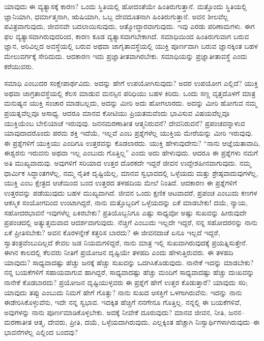 \vskip 5pt

ಯಾವುದು ಈ ವ್ಯತ್ಯಾಸಕ್ಕೆ ಕಾರಣ? ಒಂದು ಸ್ಥಿತಿಯಲ್ಲಿ ಹೋದಂತೆಯೇ ಹಿಂತಿರುಗುತ್ತಾನೆ. ಮತ್ತೊಂದು ಸ್ಥಿತಿಯಲ್ಲಿ ಜ್ಞಾನಿಯಾಗಿ, ಧರ್ಮಾತ್ಮನಾಗಿ, ಋಷಿಯಾಗಿ, ಒಬ್ಬ ದೇವದೂತನಾಗಿ ಹಿಂತಿರುಗುತ್ತಾನೆ. ಅವನ ಶೀಲವೆಲ್ಲ ಪವಿತ್ರವಾಗುವುದು, ಜೀವನವೇ ಬದಲಾಯಿಸುವುದು, ಆತ್ಮೋದ್ಧಾರವಾಗುವುದು. ಇವು ಎರಡು ಪರಿಣಾಮಗಳು. ಈಗ ಫಲ ವ್ಯತ್ಯಾಸವಾಗಿರುವುದರಿಂದ, ಕಾರಣ ಕೂಡ ವ್ಯತ್ಯಾಸವಾಗಬೇಕಾಗಿದೆ. ಸಮಾಧಿಯಿಂದ ಹಿಂತಿರುಗುವಾಗ ಬರುವ ಜ್ಞಾನ, ಅರಿವಿಲ್ಲದ ಅವಸ್ಥೆಯಲ್ಲಿ ಬರುವ ಅಥವಾ ಜಾಗೃತಾವಸ್ಥೆಯಲ್ಲಿ ಯುಕ್ತಿ ಪೂರ್ಣವಾಗಿ ಬರುವ ಜ್ಞಾನಕ್ಕಿಂತ ಬಹಳ ಮೇಲುವರ್ಗಕ್ಕೆ \break ಸೇರಿದುದು. ಆದಕಾರಣ ಇದು ಪ್ರಜ್ಞಾತೀತವಾಗಿರಬೇಕು. ಸಮಾಧಿಯನ್ನು ಪ್ರಜ್ಞಾತೀತಾವಸ್ಥೆ ಎಂದು ಕರೆಯುವರು. 

ಸಮಾಧಿ ಎಂಬುದರ ಸಂಕ್ಷೇಪಾರ್ಥವಿದು. ಅದನ್ನು ಹೇಗೆ ಉಪಯೋಗಿಸುವುದು? ಅದರ ಉಪಯೋಗ ಎಲ್ಲಿದೆ? ಯುಕ್ತಿ ಅಥವಾ ಜಾಗ್ರತಾವಸ್ಥೆಯಲ್ಲಿ ಕೆಲಸ ಮಾಡುವ ಮನಸ್ಸಿನ ಪರಿಧಿಯು ಬಹಳ ಕಿರಿದು. ಒಂದು ಸಣ್ಣ ವೃತ್ತದೊಳಗೆ ಮಾತ್ರ ಮನುಷ್ಯನ ಯುಕ್ತಿ ಸಂಚಾರ ಮಾಡಬಲ್ಲದು, ಅದನ್ನು ಮೀರಿ ಅದು ಹೋಗಲಾರದು. ಅದನ್ನು ಮೀರಿ ಹೋಗುವ ನಮ್ಮ ಪ್ರಯತ್ನವೆಲ್ಲವೂ ಅಸಾಧ್ಯ. ಆದರೂ ಮಾನವ ಕೋಟಿಯು ಪ್ರಿಯತಮವೆಂದು ಭಾವಿಸುವ ವಿಷಯವೆಲ್ಲವೂ ಯುಕ್ತಿಯೆಂಬ ಬೇಲಿಯಾಚೆ ಇರುವುವು. ಜನನಮರಣಾತೀತ ಆತ್ಮನಿರುವನೆ? ದೇವನಿರುವನೆ? ಪ್ರಪಂಚವನ್ನಾಳುವ ಯಾವುದಾದರೊಂದು ಪರಮ ಶಕ್ತಿ ಇದೆಯೆ, ಇಲ್ಲವೆ ಎಂಬ ಪ್ರಶ್ನೆಗಳೆಲ್ಲ ಯುಕ್ತಿಯ ಮೇರೆಯನ್ನು ಮೀರಿ ಇರುವುವು. ಈ ಪ್ರಶ್ನೆಗಳಿಗೆ ಯುಕ್ತಿಯು ಎಂದಿಗೂ ಉತ್ತರವನ್ನು ಕೊಡಲಾರದು. ಯುಕ್ತಿ ಹೇಳುವುದೇನು? “ನಾನು ಆಜ್ಞೆಯತಾವಾದಿ, ಈಶ್ವರನು ಇರುವನು ಅಥವಾ ಇಲ್ಲ ಎಂಬುದು ಗೊತ್ತಿಲ್ಲ” ಎಂದು ಅದು ಹೇಳುವುದು. ಆದರೂ ಈ ಪ್ರಶ್ನೆಗಳು ನಮಗೆ ಅತಿ ಮುಖ್ಯವಾದುವು. ಅವುಗಳಿಗೆ ಸರಿಯಾದ ಉತ್ತರ ದೊರಕದೇ ಇದ್ದರೆ ಜೀವನ ಉದ್ದೇಶಹೀನವಾಗುವುದು. ನಮ್ಮ ಧಾರ್ಮಿಕ ಸಿದ್ಧಾಂತಗಳೆಲ್ಲ, ನಮ್ಮ ನೈತಿಕ ದೃಷ್ಟಿಯೆಲ್ಲ, ಮಾನವ ಸ್ವಭಾವದಲ್ಲಿ ಒಳ್ಳೆಯದು ಮತ್ತು ಶ್ರೇಷ್ಠವಾದುವುಗಳೆಲ್ಲ, ಯುಕ್ತಿ ಎಂಬ ಕ್ಷೇತ್ರದ ಆಚೆಯಿಂದ ಬಂದ ಉತ್ತರದ ತಳಹದಿಯ ಮೇಲೆ ನಿಂತಿದೆ. ಆದಕಾರಣ ಈ ಪ್ರಶ್ನೆಗಳಿಗೆ ಉತ್ತರವನ್ನು ಪಡೆಯುವುದು ಬಹಳ ಮುಖ್ಯವಾಗಿದೆ. ಜೀವನ ಒಂದು ಕ್ಷಣಿಕ ಆಟವಾದರೆ, ಪ್ರಪಂಚ ಎಂಬುದು ಕಣಗಳ ಆಕಸ್ಮಿಕ ಸಂಯೋಗದಿಂದ ಉಂಟಾಗಿದ್ದರೆ, ನಾನು ಮತ್ತೊಬ್ಬರಿಗೆ ಒಳ್ಳೆಯದನ್ನು ಏಕೆ ಮಾಡಬೇಕು! ದಯೆ, ನ್ಯಾಯ, ಸಹೋದರಭಾವನೆ ಇವುಗಳೆಲ್ಲ ಏಕಿರಬೇಕು? ಪ್ರತಿಯೊಬ್ಬನಿಗೂ ಎಷ್ಟು ಸಾಧ್ಯವೋ ಅಷ್ಟು ಸುಖವನ್ನು ಹೀರುವುದೇ ಪ್ರಪಂಚದಲ್ಲಿ ಅತ್ಯುತ್ತಮವಾದ ಆದರ್ಶವಾಗುವುದು. ನೆಚ್ಚಿಗೆ ಎಂಬುದು ಇಲ್ಲದೇ ಇದ್ದರೆ, ನನ್ನ ಸಹೋದರನನ್ನು ನಾನು ಏಕೆ ಪ್ರೀತಿಸಬೇಕು? ಅವನ ಕೊರಳನ್ನೇಕೆ ಕತ್ತರಿಸ ಬಾರದು? ಈ ಜೀವನದಾಚೆ ಏನೂ ಇಲ್ಲದೆ ಇದ್ದರೆ, ಸ್ವಾತಂತ್ರವೆಂಬುದಿಲ್ಲದೆ ಕೇವಲ ಜಡ ನಿಯಮಗಳಿದ್ದರೆ, ನಾನು ಮಾತ್ರ ಇಲ್ಲಿ ಸುಖವಾಗಿರುವುದಕ್ಕೆ ಪ್ರಯತ್ನಿಸುತ್ತೇನೆ. ಈಗಿನ ಕಾಲದಲ್ಲಿ ಕೆಲವರು ನೀತಿಗೆ ಪ್ರಯೋಜನ ದೃಷ್ಟಿಯೇ ತಳಹದಿ ಎಂದು ಹೇಳುತ್ತಿರುವರು. ಈ ತಳಹದಿ ಯಾವುದು? ಸಾಧ್ಯವಾದಷ್ಟು ಹೆಚ್ಚು ಜನಕ್ಕೆ ಹೆಚ್ಚು ಸುಖವನ್ನು ಒದಗಿಸಿಕೊಡುವುದು. ನಾನೇಕೆ ಇದನ್ನು ಮಾಡಬೇಕು? ನನ್ನ ಬಯಕೆಗಳಿಗೆ ಸಹಾಯವಾಗುವ ಹಾಗಿದ್ದರೆ, ಸಾಧ್ಯವಾದಷ್ಟು ಹೆಚ್ಚು ಮಂದಿಗೆ ಸಾಧ್ಯವಾದಷ್ಟು ಹೆಚ್ಚು ದುಃಖವನ್ನು ನಾನೇಕೆ ಕೊಡಬಾರದು? ಪ್ರಯೋಜನ ದೃಷ್ಟಿಯುಳ್ಳವರು ಈ ಪ್ರಶ್ನೆಗೆ ಹೇಗೆ ಉತ್ತರ ಕೊಡುತ್ತಾರೆ? ಯಾವುದು ಸರಿ; ಯಾವುದು ತಪ್ಪು ಎಂಬುದು ನಿಮಗೆ ಹೇಗೆ ಗೊತ್ತು? ನಾನು ಸುಖದ ಆಸಕ್ತಿಗೆ ಒಳಗಾಗಿರುವೆನು. ಇದನ್ನು ನಾನು ಈಡೇರಿಸಿಕೊಳ್ಳುವೆನು, ಇದೇ ನನ್ನ ಸ್ವಭಾವ. ಇದಕ್ಕಿತ ಹೆಚ್ಚಿಗೆ ನನಗೇನೂ ಗೊತ್ತಿಲ್ಲ. ನನ್ನಲ್ಲಿ ಈ ಬಯಕೆಗಳಿವೆ, ಅವುಗಳನ್ನು ನಾನು ಪೂರ್ಣಮಾಡಿಕೊಳ್ಳಬೇಕು. ಅದಕ್ಕೆ ನೀವೇಕೆ ದೂರುವುದು? ಮಾನವ ಜೀವನ, ನೀತಿ, ಜನನ–ಮರಣಾತೀತ ಆತ್ಮ, ದೇವರು, ಪ್ರೀತಿ, ದಯೆ, ಒಳ್ಳೆಯದಾಗಿರುವುದು, ಎಲ್ಲಕ್ಕಿಂತ ಹೆಚ್ಚಾಗಿ ನಿಃಸ್ವಾರ್ಥಿಗಳಾಗಿರುವುದು–ಈ ಭಾವನೆಗಳೆಲ್ಲ ಎಲ್ಲಿಂದ ಬಂದವು?

